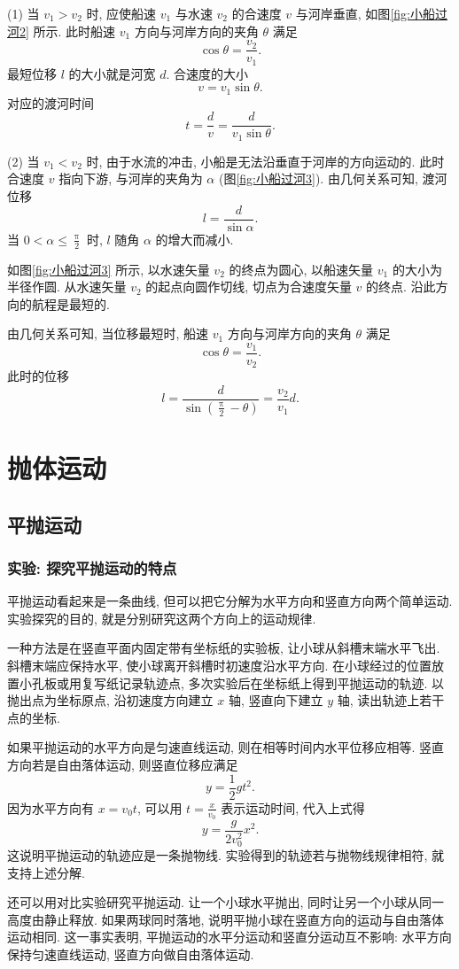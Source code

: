 \documentclass[UTF8,openany,fontset=fandol]{ctexbook}
\theoremstyle{chinesetextbook}
\begin{document}
(1) 当 $v_1>v_2$ 时, 应使船速 $v_1$ 与水速 $v_2$ 的合速度 $v$ 与河岸垂直, 如图\ref{fig:小船过河2} 所示. 此时船速 $v_1$ 方向与河岸方向的夹角 $\theta$ 满足
\[
\cos{\theta}=\frac{v_2}{v_1}.
\]
最短位移 $l$ 的大小就是河宽 $d$. 合速度的大小
\[
v=v_1\sin{\theta}.
\]
对应的渡河时间
\[
t=\frac{d}{v}=\frac{d}{v_1\sin{\theta}}.
\]

(2) 当 $v_1<v_2$ 时, 由于水流的冲击, 小船是无法沿垂直于河岸的方向运动的. 此时合速度 $v$ 指向下游, 与河岸的夹角为 $\alpha$ (图\ref{fig:小船过河3}). 由几何关系可知, 渡河位移
\[
l=\frac{d}{\sin {\alpha}}.
\]
当 $\displaystyle0<\alpha\leqslant\frac{\uppi}{2}$ 时, $l$ 随角 $\alpha$ 的增大而减小.

如图\ref{fig:小船过河3} 所示, 以水速矢量 $v_2$ 的终点为圆心, 以船速矢量 $v_1$ 的大小为半径作圆. 从水速矢量 $v_2$ 的起点向圆作切线, 切点为合速度矢量 $v$ 的终点. 沿此方向的航程是最短的.

由几何关系可知, 当位移最短时, 船速 $v_1$ 方向与河岸方向的夹角 $\theta$ 满足
\[
\cos{\theta}=\frac{v_1}{v_2}.
\]
此时的位移
\[
l=\frac{d}{\sin\left (\displaystyle\frac{\uppi}{2}-\theta\right)}=\frac{v_2}{v_1} d.
\]
\chapter{抛体运动}
\section{平抛运动}
\subsection{实验: 探究平抛运动的特点}
平抛运动看起来是一条曲线, 但可以把它分解为水平方向和竖直方向两个简单运动. 实验探究的目的, 就是分别研究这两个方向上的运动规律.

一种方法是在竖直平面内固定带有坐标纸的实验板, 让小球从斜槽末端水平飞出. 斜槽末端应保持水平, 使小球离开斜槽时初速度沿水平方向. 在小球经过的位置放置小孔板或用复写纸记录轨迹点, 多次实验后在坐标纸上得到平抛运动的轨迹. 以抛出点为坐标原点, 沿初速度方向建立 $x$ 轴, 竖直向下建立 $y$ 轴, 读出轨迹上若干点的坐标.

如果平抛运动的水平方向是匀速直线运动, 则在相等时间内水平位移应相等. 竖直方向若是自由落体运动, 则竖直位移应满足
\[
y=\frac12gt^2.
\]
因为水平方向有 $x=v_0t$, 可以用 $\displaystyle t=\frac{x}{v_0}$ 表示运动时间, 代入上式得
\[
y=\frac{g}{2v_0^2}x^2.
\]
这说明平抛运动的轨迹应是一条抛物线. 实验得到的轨迹若与抛物线规律相符, 就支持上述分解.

还可以用对比实验研究平抛运动. 让一个小球水平抛出, 同时让另一个小球从同一高度由静止释放. 如果两球同时落地, 说明平抛小球在竖直方向的运动与自由落体运动相同. 这一事实表明, 平抛运动的水平分运动和竖直分运动互不影响: 水平方向保持匀速直线运动, 竖直方向做自由落体运动.
\end{document}
